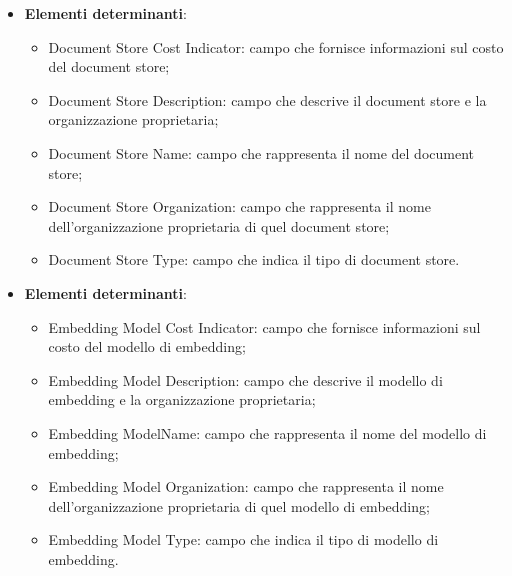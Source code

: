 \documentclass[10pt, a4paper]{article}
\begin{document}
\label{DocumentStoreCardDettaglio}
\begin{itemize}
    \item \textbf{Elementi determinanti}:
     \begin{itemize}
        \item Document Store Cost Indicator: campo che fornisce informazioni sul costo del document store;
        \item Document Store Description: campo che descrive il document store e la organizzazione proprietaria;
        \item Document Store Name: campo che rappresenta il nome del document store;
        \item Document Store Organization: campo che rappresenta il nome dell'organizzazione proprietaria di quel document store;
        \item Document Store Type: campo che indica il tipo di document store.
    \end{itemize}
\end{itemize}


\label{EmbeddingModelCardDettaglio}
\begin{itemize}
    \item \textbf{Elementi determinanti}:
     \begin{itemize}
        \item Embedding Model Cost Indicator: campo che fornisce informazioni sul costo del modello di embedding;
        \item Embedding Model Description: campo che descrive il modello di embedding e la organizzazione proprietaria;
        \item Embedding ModelName: campo che rappresenta il nome del modello di embedding;
        \item Embedding Model Organization: campo che rappresenta il nome dell'organizzazione proprietaria di quel modello di embedding;
        \item Embedding Model Type: campo che indica il tipo di modello di embedding.
        
    \end{itemize}
\end{itemize}
\end{document}
